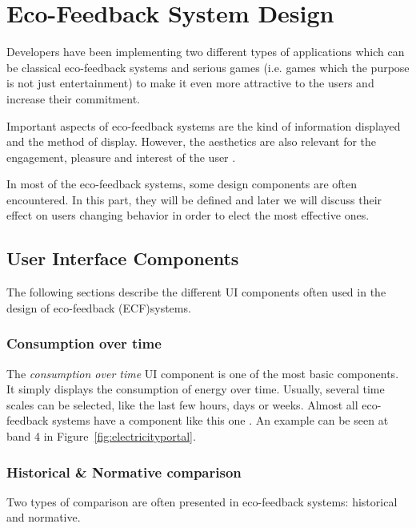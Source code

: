 \documentclass[journal]{vgtc}                %
\begin{document}
\section{Eco-Feedback System Design}
Developers have been implementing two different types of applications which can be classical eco-feedback systems and serious games (i.e. games which the purpose is not just entertainment)
to make it even more attractive to the users and increase their commitment.

Important aspects of eco-feedback systems are the kind of information displayed and the method of display. However, the aesthetics are also relevant for the engagement, pleasure and interest of the user \cite{bartram2015design}.

In most of the eco-feedback systems, some design components are often encountered.
In this part, they will be defined and later we will discuss their effect on users changing behavior in order to elect the most effective ones. 


\subsection{User Interface Components}
The following sections describe the different UI components often used in the design of eco-feedback (ECF)systems.
\subsubsection{Consumption over time}
The \textit{consumption over time} UI component is one of the most basic components. It simply displays the consumption of energy over time. Usually, several time scales can be selected, like the last few hours, days or weeks.
Almost all eco-feedback systems have a component like this one \cite{spagnolli2011eco}. 
An example can be seen at band 4 in Figure~\ref{fig:electricityportal}.

\subsubsection{Historical \& Normative comparison}
Two types of comparison are often presented in eco-feedback systems: historical and normative.\\
\end{document}
